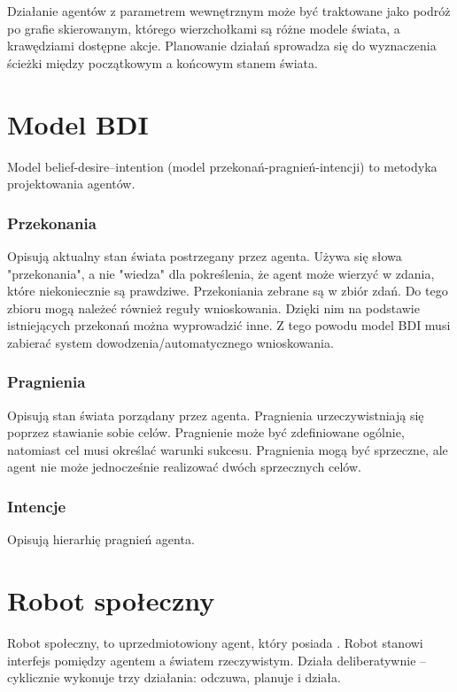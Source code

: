 Działanie agentów z parametrem wewnętrznym może być traktowane jako podróż po grafie skierowanym, którego wierzchołkami są różne modele świata, a krawędziami dostępne akcje. Planowanie działań sprowadza się do wyznaczenia ścieżki między początkowym a końcowym stanem świata.

\section{Model BDI}
Model belief-desire–intention (model przekonań-pragnień-intencji) to metodyka projektowania agentów. 

\subsubsection{Przekonania}
Opisują aktualny stan świata postrzegany przez agenta. Używa się słowa "przekonania", a nie "wiedza" dla pokreślenia, że agent może wierzyć w zdania, które niekoniecznie są prawdziwe. Przekoniania zebrane są w zbiór zdań. Do tego zbioru mogą należeć również reguły wnioskowania. Dzięki nim na podstawie istniejących przekonań można wyprowadzić inne. Z tego powodu model BDI musi zabierać system dowodzenia/automatycznego wnioskowania.

\subsubsection{Pragnienia}
Opisują stan świata porządany przez agenta. 
Pragnienia urzeczywistniają się poprzez stawianie sobie celów. Pragnienie może być zdefiniowane ogólnie, natomiast cel musi określać warunki sukcesu. Pragnienia mogą być sprzeczne, ale agent nie może jednocześnie realizować dwóch sprzecznych celów.

\subsubsection{Intencje}
Opisują hierarhię pragnień agenta. 






\section{Robot społeczny}
Robot społeczny, to uprzedmiotowiony agent, który posiada . Robot stanowi interfejs pomiędzy agentem a światem rzeczywistym. 
Działa deliberatywnie – cyklicznie wykonuje trzy działania: odczuwa, planuje i działa.
